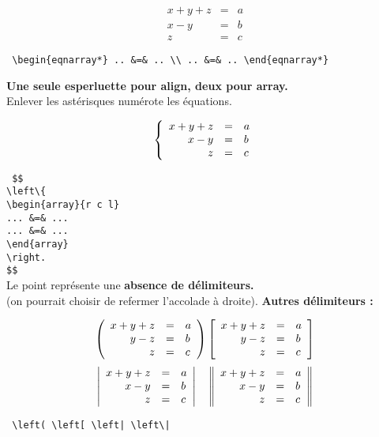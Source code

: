 \documentclass{report}
\begin{document}
\begin{eqnarray*}
x + y + z &=& a\\
x - y &=& b\\
z &=& c
\end{eqnarray*}

\begin{center}
\texttt{
\textbackslash{}begin\{eqnarray*\} .. \&=\& .. \textbackslash{}\textbackslash{} .. \&=\& .. \textbackslash{}end\{eqnarray*\}
}\\
\end{center}

\textbf{Une seule esperluette pour align, deux pour  array.}\\
Enlever les astérisques numérote les équations. 

$$
\left\{
\begin{array}{r c l}
x + y + z &=& a\\
x - y &=& b\\
z &=& c
\end{array}
\right.
$$

\texttt{
\$\$ \\
\textbackslash{}left\textbackslash{}\{ \\
\textbackslash{}begin\{array\}\{r c l\} \\
... \&=\& ... \\
... \&=\& ... \\
\textbackslash{}end\{array\} \\
\textbackslash{}right. \\
\$\$
} \\
Le point représente une \textbf{absence de délimiteurs.} \\
(on pourrait choisir de refermer l'accolade à droite).
\bigskip
\textbf{Autres délimiteurs :}





$$
\left(
\begin{array}{r c l}
x + y + z &=& a\\
y - z &=& b\\
z &=& c 
\end{array}
\right)
\left[
\begin{array}{r c l}
x + y + z &=& a\\
y - z &=& b\\
z &=& c 	
\end{array}
\right]
$$
$$
\left|
\begin{array}{r c l}
x + y + z &=& a\\
x - y &=& b\\
z &=& c
\end{array}
\right|
\quad
\left\|
\begin{array}{r c l}
x + y + z &=& a\\
x - y &=& b\\
z &=& c
\end{array}
\right\|
$$
\bigskip
\begin{center}
\texttt{ \textbackslash{}left( \qquad \textbackslash{}left[ \qquad \textbackslash{}left| \qquad \textbackslash{}left\textbackslash{}| }
\end{center}
\end{document}
